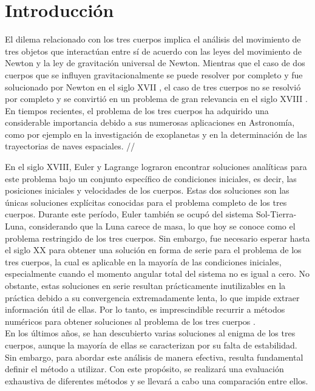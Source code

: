 \documentclass{article}
\begin{document}
\section{Introducción}
El dilema relacionado con los tres cuerpos implica el análisis 
del movimiento de tres objetos que interactúan entre sí de 
acuerdo con las leyes del movimiento de Newton y la ley 
de gravitación universal de Newton. Mientras que el caso 
de dos cuerpos que se influyen gravitacionalmente se 
puede resolver por completo y fue solucionado por 
Newton en el siglo XVII , el caso de tres cuerpos
no se resolvió por completo y se convirtió en un 
problema de gran relevancia en el siglo XVIII \cite{musielak2014three}. En 
tiempos recientes, el problema de los tres cuerpos ha 
adquirido una considerable importancia debido a sus numerosas 
aplicaciones en Astronomía, como por ejemplo en la investigación 
de exoplanetas y en la determinación de las trayectorias 
de naves espaciales. //


En el siglo XVIII, Euler y Lagrange lograron encontrar 
soluciones analíticas para este problema bajo un conjunto 
específico de condiciones iniciales, es decir, las 
posiciones iniciales y velocidades de los cuerpos. 
Estas dos soluciones son las únicas soluciones explícitas 
conocidas para el problema completo de los tres cuerpos. 
Durante este período, Euler también se ocupó del sistema 
Sol-Tierra-Luna, considerando que la Luna carece de masa, 
lo que hoy se conoce como el problema restringido de 
los tres cuerpos. Sin embargo, fue necesario esperar 
hasta el siglo XX para obtener una solución en forma 
de serie para el problema de los tres cuerpos, la cual 
es aplicable en la mayoría de las condiciones iniciales, 
especialmente cuando el momento angular total del sistema 
no es igual a cero. No obstante, estas soluciones en 
serie resultan prácticamente inutilizables en la práctica 
debido a su convergencia extremadamente lenta, lo que 
impide extraer información útil de ellas. Por lo tanto, 
es imprescindible recurrir a métodos numéricos para 
obtener soluciones al problema de los tres cuerpos \cite{musielak2014three}.\\


En los últimos años, se han descubierto varias 
soluciones al enigma de los tres cuerpos, 
aunque la mayoría de ellas se caracterizan 
por su falta de estabilidad. Sin embargo, 
para abordar este análisis de manera efectiva, 
resulta fundamental definir el método a utilizar. 
Con este propósito, se realizará una 
evaluación exhaustiva de diferentes métodos y se 
llevará a cabo una comparación entre ellos. \\
\end{document}
